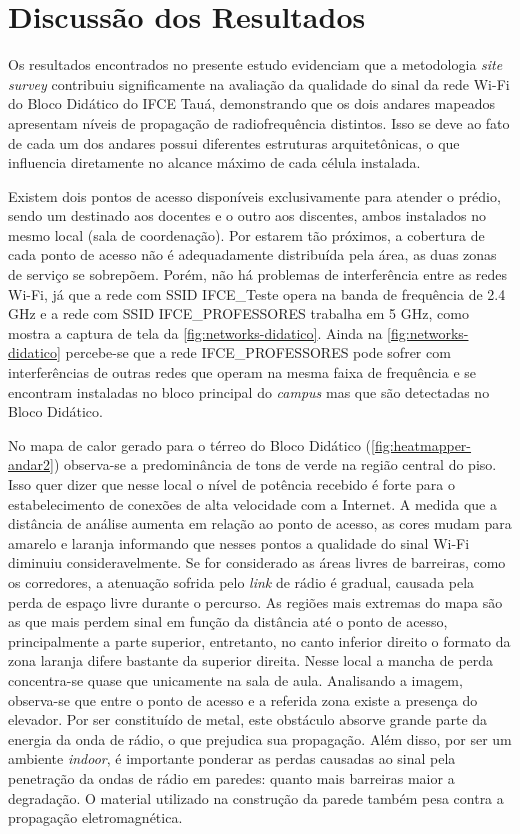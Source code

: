 \section{Discussão dos Resultados}
\label{discussao-dos-resultados}

Os resultados encontrados no presente estudo evidenciam que a metodologia \textit{site survey} contribuiu significamente na avaliação da qualidade do sinal da rede Wi-Fi do Bloco Didático do IFCE Tauá, demonstrando que os dois andares mapeados apresentam níveis de propagação de radiofrequência distintos. Isso se deve ao fato de cada um dos andares possui diferentes estruturas arquitetônicas, o que influencia diretamente no alcance máximo de cada célula instalada.
	
Existem dois pontos de acesso disponíveis exclusivamente para atender o prédio, sendo um destinado aos docentes e o outro aos discentes, ambos instalados no mesmo local (sala de coordenação). Por estarem tão próximos, a cobertura de cada ponto de acesso não é adequadamente distribuída pela área, as duas zonas de serviço se sobrepõem. Porém, não há problemas de interferência entre as redes Wi-Fi, já que a rede com SSID IFCE\_Teste opera na banda de frequência de 2.4 GHz e a rede com SSID IFCE\_PROFESSORES trabalha em 5 GHz, como mostra a captura de tela da \autoref{fig:networks-didatico}. Ainda na \autoref{fig:networks-didatico} percebe-se que a rede IFCE\_PROFESSORES pode sofrer com interferências de outras redes que operam na mesma faixa de frequência e se encontram instaladas no bloco principal do \textit{campus} mas que são detectadas no Bloco Didático.

No mapa de calor gerado para o térreo do Bloco Didático (\autoref{fig:heatmapper-andar2}) observa-se a predominância de tons de verde na região central do piso. Isso quer dizer que nesse local o nível de potência recebido é forte para o estabelecimento de conexões de alta velocidade com a Internet. A medida que a distância de análise aumenta em relação ao ponto de acesso, as cores mudam para amarelo e laranja informando que nesses pontos a qualidade do sinal Wi-Fi diminuiu consideravelmente. Se for considerado as áreas livres de barreiras, como os corredores, a atenuação sofrida pelo \textit{link} de rádio é gradual, causada pela perda de espaço livre durante o percurso. As regiões mais extremas do mapa são as que mais perdem sinal em função da distância até o ponto de acesso, principalmente a parte superior, entretanto, no canto inferior direito o formato da zona laranja difere bastante da superior direita. Nesse local a mancha de perda concentra-se quase que unicamente na sala de aula. Analisando a imagem, observa-se que entre o ponto de acesso e a referida zona existe a presença do elevador. Por ser constituído de metal, este obstáculo absorve grande parte da energia da onda de rádio, o que prejudica sua propagação. Além disso, por ser um ambiente \textit{indoor}, é importante ponderar as perdas causadas ao sinal pela penetração da ondas de rádio em paredes: quanto mais barreiras maior a degradação. O material utilizado na construção da parede também pesa contra a propagação eletromagnética.


